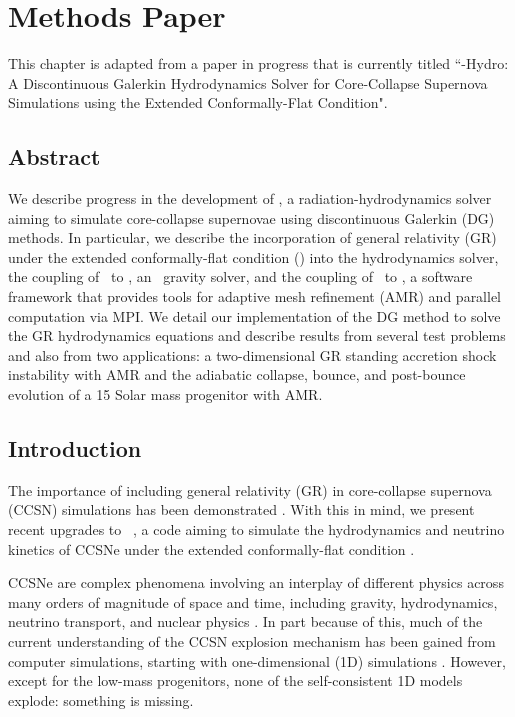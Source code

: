 \chapter{Methods Paper}
\label{ch.mp}

This chapter is adapted from
a paper in progress that is currently titled
``\thornado-Hydro: A Discontinuous Galerkin Hydrodynamics Solver for
Core-Collapse Supernova Simulations using the
Extended Conformally-Flat Condition".

\section{Abstract}

We describe progress in the development of \thornado, a radiation-hydrodynamics
solver aiming to simulate core-collapse supernovae using discontinuous Galerkin
(DG) methods.
In particular, we describe the incorporation of general relativity (GR) under
the extended conformally-flat condition (\xcfc) into the hydrodynamics solver,
the coupling of \thornado\ to \poseidon, an \xcfc\ gravity solver,
and the coupling of \thornado\ to \amrex, a software framework that provides
tools for adaptive mesh refinement (AMR) and parallel computation via MPI.
We detail our implementation of the DG method to solve the GR hydrodynamics
equations and describe results from several test problems and also from two
applications: a two-dimensional GR standing accretion shock instability with
AMR and the adiabatic collapse, bounce, and post-bounce evolution of a
15 Solar mass progenitor with AMR.

\section{Introduction}

The importance of including general relativity (GR) in core-collapse supernova
(CCSN) simulations has been demonstrated
\citep{bdm2001,mjm2012,lmm2012,oc2018}.
With this in mind, we present recent upgrades to \thornado\ \citep{pbe2021},
a code aiming to simulate the hydrodynamics and neutrino kinetics of CCSNe under
the extended conformally-flat condition \citep[\xcfc;][]{wmm1996,ccd2009}.

CCSNe are complex phenomena involving an interplay of different physics
across many orders of magnitude of space and time, including gravity,
hydrodynamics, neutrino transport, and nuclear physics
\citep[e.g., see][for reviews]{b1990,m2005,j2012,b2013,m2016,mem2020}.
In part because of this, much of the current understanding of the CCSN explosion
mechanism has been gained from computer simulations, starting with
one-dimensional (1D) simulations
\citep[e.g., see][]{%
cj1960,
mw1966,
cw1966,
r1979,
hm1981,
bw1985,
mim1991,
mb1993,
mb1993a,
mb1993b,
rj2000,
mlm2001,
rj2002,
twi2003,
tbp2003,
lmm2004,
kjh2006,
sys2007,
zwh2008,
hmj2010,
thr2017,
sro2019,
bmo2021,
gmm2023%
}.
However, except for the low-mass progenitors, none of the self-consistent 1D
models explode: something is missing.

